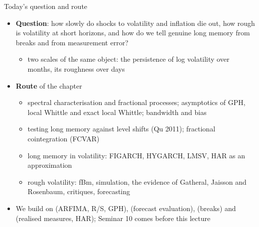 
\begin{frame}{Today's question and route}
\itemsize{\small}
\begin{itemize}
    \item \textbf{Question}: how slowly do shocks to volatility and inflation die out, how rough is volatility at short horizons, and how do we tell genuine long memory from breaks and from measurement error?
    \begin{itemize}
        \item two scales of the same object: the persistence of log volatility over months, its roughness over days
    \end{itemize}
    \item \textbf{Route} of the chapter
    \begin{itemize}
        \item spectral characterisation and fractional processes; asymptotics of GPH, local Whittle and exact local Whittle; bandwidth and bias
        \item testing long memory against level shifts (Qu 2011); fractional cointegration (FCVAR)
        \item long memory in volatility: FIGARCH, HYGARCH, LMSV, HAR as an approximation
        \item rough volatility: fBm, simulation, the evidence of Gatheral, Jaisson and Rosenbaum, critiques, forecasting
    \end{itemize}
    \item We build on  (ARFIMA, R/S, GPH),  (forecast evaluation),  (breaks) and  (realised measures, HAR); Seminar 10 comes before this lecture
\end{itemize}
\end{frame}

